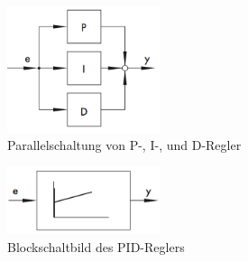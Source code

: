 \begin{figure}[h!, width=\pagewidth]
    \centering
    \includegraphics[width=0.4\textwidth]{images/PRDRegler1}
    \caption{Parallelschaltung von P-, I-, und D-Regler}
    \label{fig:PRDRegler1}
\end{figure}

\begin{figure}[h!, width=\pagewidth]
    \centering
    \includegraphics[width=0.4\textwidth]{images/PIDRegler2.png}
    \caption{Blockschaltbild des PID-Reglers}
    \label{fig:PID}
\end{figure}
